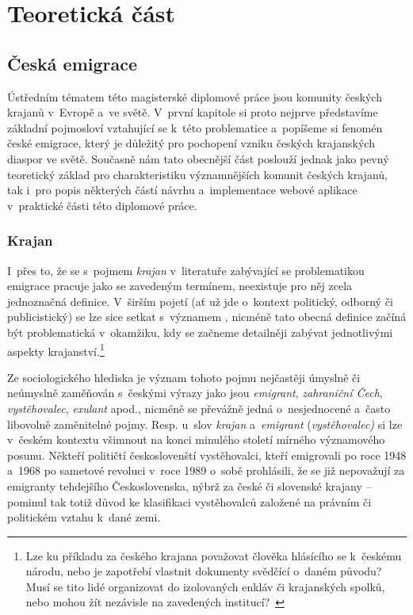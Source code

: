 \part{Teoretická část}

\hypertarget{ux10deskuxe1-emigrace}{%
\chapter{Česká emigrace}\label{ux10deskuxe1-emigrace}}

Ústředním tématem této magisterské diplomové práce jsou komunity českých krajanů v~Evropě a~ve světě. V~první kapitole si proto nejprve představíme základní pojmosloví vztahující se k~této problematice a~popíšeme si fenomén české emigrace, který je důležitý pro pochopení vzniku českých krajanských diaspor ve světě. Současně nám tato obecnější část poslouží jednak jako pevný teoretický základ pro charakteristiku významnějších komunit českých krajanů, tak i~pro popis některých částí návrhu a~implementace webové aplikace v~praktické části této diplomové práce.

\hypertarget{krajan}{%
\section{Krajan}\label{krajan}}

I~přes to, že se s~pojmem \emph{krajan} v~literatuře zabývající se problematikou emigrace pracuje jako se zavedeným termínem, neexistuje pro něj zcela jednoznačná definice. V~širším pojetí (ať už jde o~kontext politický, odborný či publicistický) se lze sice setkat s~významem , nicméně tato obecná definice začíná být problematická v~okamžiku, kdy se začneme detailněji zabývat jednotlivými aspekty krajanství.\footnote{Lze ku příkladu za českého krajana považovat člověka hlásícího se k~českému národu, nebo je zapotřebí vlastnit dokumenty svědčící o~daném původu? Musí se tito lidé organizovat do izolovaných enkláv či krajanských spolků, nebo mohou žít nezávisle na zavedených institucí?~\parencite{Jakoubek2015}}~\parencite{Jakoubek2015}

Ze sociologického hlediska je význam tohoto pojmu nejčastěji úmyslně či neúmyslně zaměňován s~českými výrazy jako jsou \emph{emigrant}, \emph{zahraniční Čech}, \emph{vystěhovalec}, \emph{exulant} apod., nicméně se převážně jedná o~nesjednocené a~často libovolně zaměnitelné pojmy. Resp. u~slov \emph{krajan} a~\emph{emigrant} (\emph{vystěhovalec)} si lze v~českém kontextu všimnout na konci minulého století mírného významového posunu. Někteří političtí českoslovenští vystěhovalci, kteří emigrovali po roce 1948 a~1968 po sametové revoluci v~roce 1989 o~sobě prohlásili, že se již nepovažují za emigranty tehdejšího Československa, nýbrž za české či slovenské krajany -- pominul tak totiž důvod ke klasifikaci vystěhovalců založené na právním či politickém vztahu k~dané zemi.~\parencite{Broucek2017}

